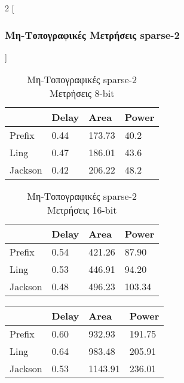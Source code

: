 \begin{multicols}{2}
[\subsubsection{Μη-Τοπογραφικές Μετρήσεις sparse-2}]

\begin{table}[H]
\centering
     \begin{tabular}{||p{1.2cm} | p{0.7cm} p{1cm} p{1cm}||} 
        \hline
        & Delay & Area & Power \\ [0.5ex] 
        \hline\hline
        Prefix  & 0.44  & 173.73    & 40.2 \\ 
        \hline
        Ling    & 0.47  & 186.01    & 43.6 \\
        \hline
        Jackson & 0.42  & 206.22    & 48.2 \\
        \hline
    \end{tabular}
\caption{Μη-Τοπογραφικές sparse-2 Μετρήσεις 8-bit}
\label{notopo_sparse2_result_table_8}
\end{table}
\begin{table}[H]
\centering
     \begin{tabular}{||p{1.2cm} | p{0.7cm} p{1cm} p{1cm}||} 
        \hline
        & Delay & Area & Power \\ [0.5ex] 
        \hline\hline
        Prefix  & 0.54  & 421.26    & 87.90 \\ 
        \hline
        Ling    & 0.53  & 446.91    & 94.20 \\
        \hline
        Jackson & 0.48  & 496.23    & 103.34 \\
        \hline
    \end{tabular}
\caption{Μη-Τοπογραφικές sparse-2 Μετρήσεις 16-bit}
\label{topo_sparse2_result_table_16}
\end{table}
\begin{table}[H]
\centering
     \begin{tabular}{||p{1.2cm} | p{0.7cm} p{1cm} p{1cm}||} 
        \hline
         & Delay & Area & Power \\ [0.5ex] 
        \hline\hline
        Prefix  & 0.60  & 932.93    & 191.75 \\ 
        \hline
        Ling    & 0.64  & 983.48    &  205.91 \\
        \hline
        Jackson & 0.53  & 1143.91    & 236.01 \\

\end{tabular}
\end{table}
\end{multicols}

